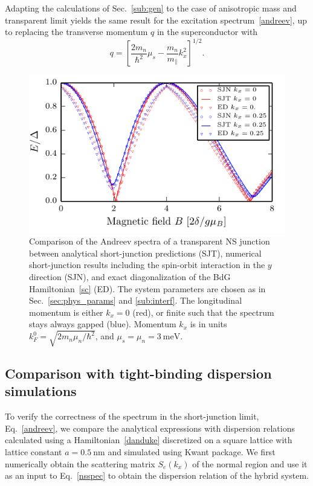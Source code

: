 Adapting the calculations of Sec.~\ref{sub:gen} to the case of anisotropic mass and transparent limit yields the same result for the excitation spectrum~\eqref{andreev}, up to replacing the transverse momentum $q$ in the superconductor with
\begin{equation}\label{aniso}
q = \left[\frac{2m_n}{\hbar^2}\mu_s
-\frac{m_n}{m_\parallel}k_x^2\right]^{1/2}.
\end{equation}

\begin{figure}
\begin{center}
\includegraphics[width=0.7\columnwidth]{chapter_shortjunction/figures/spec_comp}
\caption{Comparison of the Andreev spectra of a transparent NS junction between analytical short-junction predictions (SJT), numerical short-junction results including the spin-orbit interaction in the $y$ direction (SJN), and exact diagonalization of the BdG Hamiltonian~\eqref{sc} (ED).
The system parameters are chosen as in Sec.~\ref{sec:phys_params} and \ref{sub:interf}.
The longitudinal momentum is either $k_x=0$ (red), or finite such that the spectrum stays always gapped (blue).
Momentum $k_x$ is in units $k_F^0=\sqrt{2m_n\mu_n/\hbar^2}$, and $\mu_s=\mu_n=\SI{3}{\meV}$.}
\label{fig:spec_comp}
\end{center}
\end{figure}

\subsection{Comparison with tight-binding dispersion simulations}
To verify the correctness of the spectrum in the short-junction limit, Eq.~\eqref{andreev}, we compare the analytical expressions with dispersion relations calculated using a Hamiltonian~\eqref{danduke} discretized on a square lattice with lattice constant $a=\SI{0.5}{\nm}$ and simulated using Kwant package\cite{Groth2014}.
We first numerically obtain the scattering matrix $S_e(k_x)$ of the normal region and use it as an input to Eq.~\eqref{nsspec} to obtain the dispersion relation of the hybrid system.

